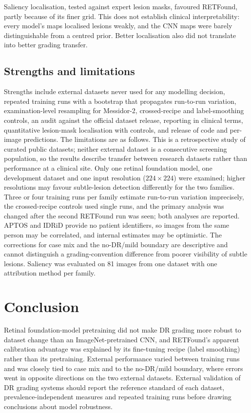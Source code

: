 \documentclass[pdflatex,sn-basic,Numbered]{sn-jnl}
\begin{document}
Saliency localisation, tested against expert lesion masks, favoured RETFound, partly because of its finer grid. This does not establish clinical interpretability: every model's maps localised lesions weakly, and the CNN maps were barely distinguishable from a centred prior. Better localisation also did not translate into better grading transfer.

\subsection*{Strengths and limitations}

Strengths include external datasets never used for any modelling decision, repeated training runs with a bootstrap that propagates run-to-run variation, examination-level resampling for Messidor-2, crossed-recipe and label-smoothing controls, an audit against the official dataset release, reporting in clinical terms, quantitative lesion-mask localisation with controls, and release of code and per-image predictions. The limitations are as follows. This is a retrospective study of curated public datasets; neither external dataset is a consecutive screening population, so the results describe transfer between research datasets rather than performance at a clinical site. Only one retinal foundation model, one development dataset and one input resolution ($224\times224$) were examined; higher resolutions may favour subtle-lesion detection differently for the two families. Three or four training runs per family estimate run-to-run variation imprecisely, the crossed-recipe controls used single runs, and the primary analysis was changed after the second RETFound run was seen; both analyses are reported. APTOS and IDRiD provide no patient identifiers, so images from the same person may be correlated, and internal estimates may be optimistic. The corrections for case mix and the no-DR/mild boundary are descriptive and cannot distinguish a grading-convention difference from poorer visibility of subtle lesions. Saliency was evaluated on 81 images from one dataset with one attribution method per family.

\section{Conclusion}\label{sec:conclusion}

Retinal foundation-model pretraining did not make DR grading more robust to dataset change than an ImageNet-pretrained CNN, and RETFound's apparent calibration advantage was explained by its fine-tuning recipe (label smoothing) rather than its pretraining. External performance varied between training runs and was closely tied to case mix and to the no-DR/mild boundary, where errors went in opposite directions on the two external datasets. External validation of DR grading systems should report the reference standard of each dataset, prevalence-independent measures and repeated training runs before drawing conclusions about model robustness.
\end{document}

